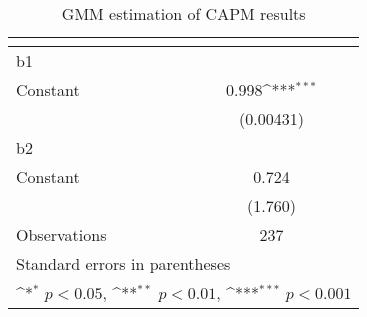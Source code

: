 \begin{table}[htbp]\centering
\def\sym#1{\ifmmode^{#1}\else\(^{#1}\)\fi}
\caption{GMM estimation of CAPM results}
\begin{tabular}{l*{1}{c}}
\hline\hline
                    &\multicolumn{1}{c}{} \\
\hline
b1                  &                     \\
Constant            &       0.998\sym{***}\\
                    &   (0.00431)         \\
\hline
b2                  &                     \\
Constant            &       0.724         \\
                    &     (1.760)         \\
\hline
Observations        &         237         \\
\hline\hline
\multicolumn{2}{l}{\footnotesize Standard errors in parentheses}\\
\multicolumn{2}{l}{\footnotesize \sym{*} \(p<0.05\), \sym{**} \(p<0.01\), \sym{***} \(p<0.001\)}\\
\end{tabular}
\end{table}
